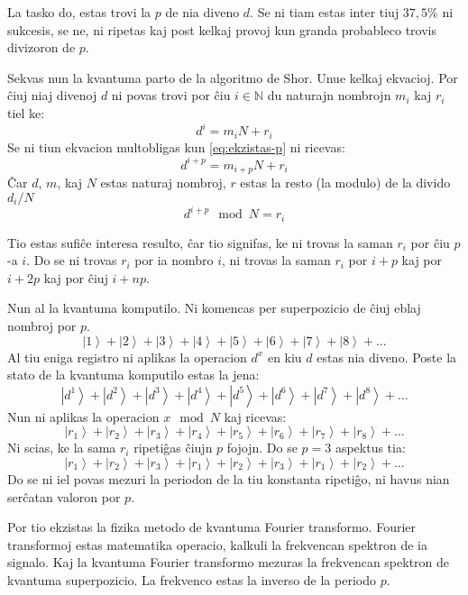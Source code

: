 \documentclass[utf8]{scrartcl}
\begin{document}
La tasko do, estas trovi la $p$ de nia diveno $d$. Se ni tiam estas inter tiuj
$37,5 \%$ ni sukcesis, se ne, ni ripetas kaj post kelkaj provoj kun granda
probableco trovis divizoron de $p$.

Sekvas nun la kvantuma parto de la algoritmo de Shor. Unue kelkaj ekvacioj. Por
ĉiuj niaj divenoj $d$ ni povas trovi por ĉiu $i\in\mathbb{N}$ du naturajn
nombrojn $m_i$ kaj $r_i$ tiel ke:
\begin{equation}
  \label{eq:di-rilato}
  d^i = m_i N + r_i
\end{equation}
%
Se ni tiun ekvacion multobligas kun \eqref{eq:ekzistas-p} ni ricevas:
\begin{equation}
  \label{eq:di-p-rilato}
  d^{i+p} = m_{i+p} N + r_i
\end{equation}
%
Ĉar $d$, $m$, kaj $N$ estas naturaj nombroj, $r$ estas la resto (la modulo) de
la divido $d_i/N$
\begin{equation}
  \label{eq:di-mod-ri}
  d^{i+p}\mod N = r_i
\end{equation}

Tio estas sufiĉe interesa resulto, ĉar tio signifas, ke ni trovas la saman
$r_i$ por ĉiu $p$-a $i$. Do se ni trovas $r_i$ por ia nombro $i$, ni trovas la
saman $r_i$ por $i + p$ kaj por $i + 2p$ kaj por ĉiuj $i + np$.

Nun al la kvantuma komputilo. Ni komencas per superpozicio de ĉiuj eblaj
nombroj por $p$.
\[\left|1\right> + \left|2\right> + \left|3\right> + \left|4\right> +
  \left|5\right> + \left|6\right> + \left|7\right> + \left|8\right> + \ldots \]
%
Al tiu eniga registro ni aplikas la operacion $d^x$ en kiu $d$ estas nia
diveno. Poste la stato de la kvantuma komputilo estas la jena:
\[\left|d^1\right> + \left|d^2\right> + \left|d^3\right> + \left|d^4\right> +
  \left|d^5\right> + \left|d^6\right> + \left|d^7\right> + \left|d^8\right> +
  \ldots\]
%
Nun ni aplikas la operacion $x\mod N$ kaj ricevas:
\[\left|r_1\right> + \left|r_2\right> + \left|r_3\right> + \left|r_4\right> +
  \left|r_5\right> + \left|r_6\right> + \left|r_7\right> + \left|r_8\right> +
  \ldots\]
%
Ni scias, ke la sama $r_i$ ripetiĝas ĉiujn $p$ fojojn. Do se $p=3$ aspektus
tia:
\[\left|r_1\right> + \left|r_2\right> + \left|r_3\right> + \left|r_1\right> +
  \left|r_2\right> + \left|r_3\right> + \left|r_1\right> + \left|r_2\right> +
  \ldots\]
%
Do se ni iel povas mezuri la periodon de la tiu konstanta ripetiĝo, ni havus
nian serĉatan valoron por $p$.

Por tio ekzistas la fizika metodo de kvantuma Fourier transformo. Fourier
transformoj estas matematika operacio, kalkuli la frekvencan spektron de ia
signalo. Kaj la kvantuma Fourier transformo mezuras la frekvencan spektron de
kvantuma superpozicio. La frekvenco estas la inverso de la periodo $p$.
\end{document}
